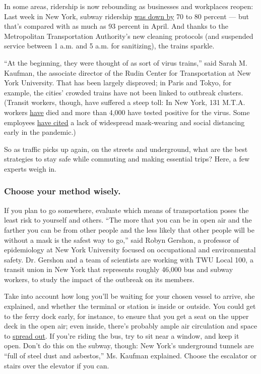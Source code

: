 In some areas, ridership is now rebounding as businesses and workplaces
reopen: Last week in New York, subway ridership
\href{https://new.mta.info/coronavirus/ridership}{was down by} 70 to 80
percent --- but that's compared with as much as 93 percent in April. And
thanks to the Metropolitan Transportation Authority's new cleaning
protocols (and suspended service between 1 a.m. and 5 a.m. for
sanitizing), the trains sparkle.

``At the beginning, they were thought of as sort of virus trains,'' said
Sarah M. Kaufman, the associate director of the Rudin Center for
Transportation at New York University. That has been largely disproved;
in Paris and Tokyo, for example, the cities' crowded trains have not
been linked to outbreak clusters. (Transit workers, though, have
suffered a steep toll: In New York, 131 M.T.A. workers
\href{https://www.nytimes3xbfgragh.onion/interactive/2020/07/26/nyregion/nyc-covid-19-mta-transit-workers.html}{have}
died and more than 4,000 have tested positive for the virus. Some
employees
\href{https://www.nytimes3xbfgragh.onion/2020/04/08/nyregion/coronavirus-nyc-mta-subway.html}{have
cited} a lack of widespread mask-wearing and social distancing early in
the pandemic.)

So as traffic picks up again, on the streets and underground, what are
the best strategies to stay safe while commuting and making essential
trips? Here, a few experts weigh in.

\hypertarget{choose-your-method-wisely}{%
\subsubsection{Choose your method
wisely.}\label{choose-your-method-wisely}}

If you plan to go somewhere, evaluate which means of transportation
poses the least risk to yourself and others. ``The more that you can be
in open air and the farther you can be from other people and the less
likely that other people will be without a mask is the safest way to
go,'' said Robyn Gershon, a professor of epidemiology at New York
University focused on occupational and environmental safety. Dr. Gershon
and a team of scientists are working with TWU Local 100, a transit union
in New York that represents roughly 46,000 bus and subway workers, to
study the impact of the outbreak on its members.

Take into account how long you'll be waiting for your chosen vessel to
arrive, she explained, and whether the terminal or station is inside or
outside. You could get to the ferry dock early, for instance, to ensure
that you get a seat on the upper deck in the open air; even inside,
there's probably ample air circulation and space to
\href{https://twitter.com/vinbarone/status/1270470612071440386}{spread
out}. If you're riding the bus, try to sit near a window, and keep it
open. Don't do this on the subway, though: New York's underground
tunnels are ``full of steel dust and asbestos,'' Ms. Kaufman explained.
Choose the escalator or stairs over the elevator if you can.

